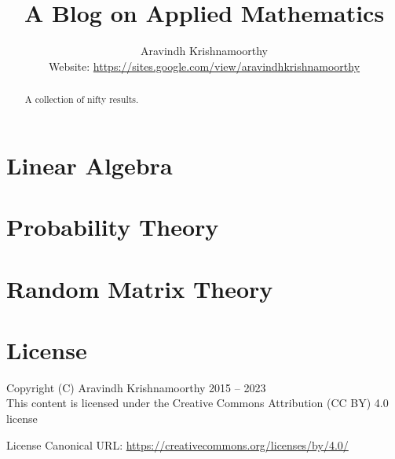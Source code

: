 \documentclass[a4paper,dvipsnames]{report}
\title{A Blog on Applied Mathematics}
\author{Aravindh Krishnamoorthy\\\small Website: \url{https://sites.google.com/view/aravindhkrishnamoorthy}}
\begin{document}
\maketitle
\renewcommand{\abstractname}{Preface}
\begin{abstract}
\begin{center}
 	A collection of nifty results.
\end{center}
\end{abstract}
\tableofcontents

\chapter{Linear Algebra}




\chapter{Probability Theory}





\chapter{Random Matrix Theory}



\chapter{License}
Copyright (C) Aravindh Krishnamoorthy 2015 -- 2023\\
This content is licensed under the Creative Commons Attribution (CC BY) 4.0 license

\noindent License Canonical URL: \url{https://creativecommons.org/licenses/by/4.0/}


\end{document}
